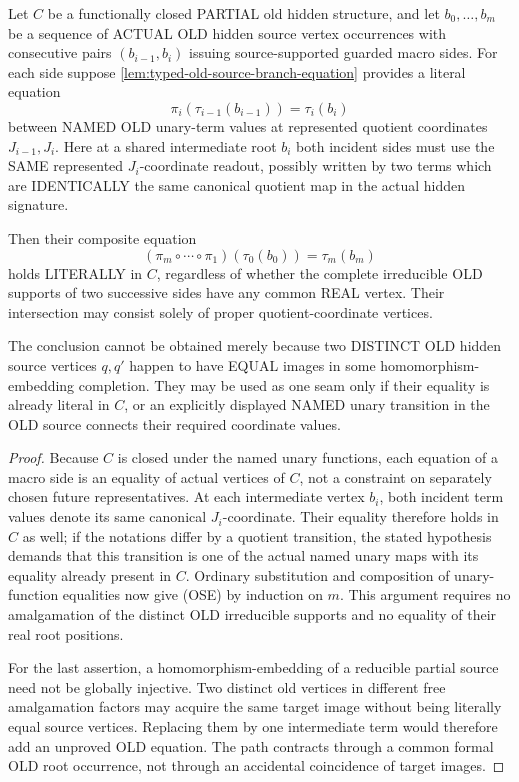 \begin{lemma}
\label{lem:typed-old-seam-telescope}
Let \(C\) be a functionally closed
PARTIAL old hidden structure,
and let \(b_0,\ldots,b_m\)
be a sequence of ACTUAL OLD
hidden source vertex occurrences
with consecutive pairs
\((b_{i-1},b_i)\) issuing
source-supported guarded macro
sides. For each side suppose
\cref{lem:typed-old-source-branch-equation}
provides a literal equation
\[
 \pi_i(\tau_{i-1}(b_{i-1}))
       =\tau_i(b_i)
\]
between NAMED OLD unary-term
values at represented quotient
coordinates \(J_{i-1},J_i\).
Here at a shared intermediate
root \(b_i\) both incident sides
must use the SAME represented
\(J_i\)-coordinate readout,
possibly written by two terms
which are IDENTICALLY the same
canonical quotient map in the
actual hidden signature.

Then their composite equation
\[
 (\pi_m\circ\cdots\circ\pi_1)
    (\tau_0(b_0))=\tau_m(b_m)
\tag{OSE}\label{eq:typed-old-seam-telescope}
\]
holds LITERALLY in \(C\),
regardless of whether the
complete irreducible OLD
supports of two successive
sides have any common REAL
vertex. Their intersection may
consist solely of proper
quotient-coordinate vertices.

The conclusion cannot be
obtained merely because two
DISTINCT OLD hidden source
vertices \(q,q'\) happen to
have EQUAL images in some
homomorphism-embedding completion.
They may be used as one seam
only if their equality is
already literal in \(C\), or
an explicitly displayed NAMED
unary transition in the OLD
source connects their required
coordinate values.
\end{lemma}
\begin{proof}
Because \(C\) is closed under
the named unary functions,
each equation of a macro side
is an equality of actual
vertices of \(C\), not a
constraint on separately
chosen future representatives.
At each intermediate vertex
\(b_i\), both incident term
values denote its same
canonical \(J_i\)-coordinate.
Their equality therefore
holds in \(C\) as well;
if the notations differ by a
quotient transition, the
stated hypothesis demands
that this transition is one
of the actual named unary
maps with its equality already
present in \(C\).
Ordinary substitution and
composition of unary-function
equalities now give (OSE)
by induction on \(m\).
This argument requires no
amalgamation of the distinct
OLD irreducible supports and
no equality of their real
root positions.

For the last assertion,
a homomorphism-embedding of
a reducible partial source
need not be globally
injective. Two distinct old
vertices in different free
amalgamation factors may
acquire the same target image
without being literally
equal source vertices.
Replacing them by one
intermediate term would
therefore add an unproved
OLD equation. The path
contracts through a common
formal OLD root occurrence,
not through an accidental
coincidence of target images.
\end{proof}

